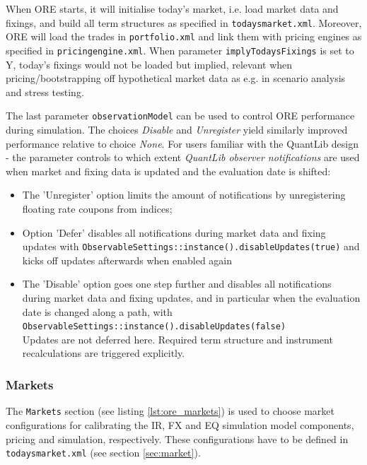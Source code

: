 \documentclass[12pt, a4paper]{article}
\begin{document}
When ORE starts, it will initialise today's market, i.e. load market data and fixings, and build all term structures as
specified in {\tt todaysmarket.xml}.  Moreover, ORE will load the trades in {\tt portfolio.xml} and link them with
pricing engines as specified in {\tt pricingengine.xml}. When parameter {\tt implyTodaysFixings} is set to Y, today's
fixings would not be loaded but implied, relevant when pricing/bootstrapping off hypothetical market data as e.g. in
scenario analysis and stress testing.

\medskip The last parameter {\tt observationModel} can be used to control ORE performance during simulation. The choices
{\em Disable } and {\em Unregister } yield similarly improved performance relative to choice {\em None}. For users
familiar with the QuantLib design - the parameter controls to which extent {\em QuantLib observer notifications} are
used when market and fixing data is updated and the evaluation date is shifted:
\begin{itemize}
\item The 'Unregister' option limits the amount of notifications by unregistering floating rate coupons from indices;
\item Option 'Defer' disables all notifications during market data and fixing updates with
{\tt ObservableSettings::instance().disableUpdates(true)}
and kicks off updates afterwards when enabled again
\item The 'Disable' option goes one step further and disables all notifications during market data and fixing updates,
  and in particular when the evaluation date is changed along a path, with \\
  {\tt ObservableSettings::instance().disableUpdates(false)} \\
  Updates are not deferred here. Required term structure and instrument recalculations are triggered explicitly.
\end{itemize}

\subsubsection{Markets}\label{sec:master_input_markets}

The {\tt Markets} section (see listing \ref{lst:ore_markets}) is used to choose market configurations for calibrating
the IR, FX and EQ simulation model components, pricing and simulation, respectively. These configurations have to be 
defined
in {\tt todaysmarket.xml} (see section \ref{sec:market}).
\end{document}

